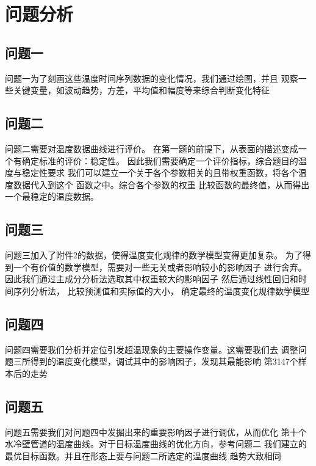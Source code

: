 \section{问题分析}
    \subsection{问题一}
    问题一为了刻画这些温度时间序列数据的变化情况，我们通过绘图，并且
    观察一些关键变量，如波动趋势，方差，平均值和幅度等来综合判断变化特征
    \subsection{问题二}
    问题二需要对温度数据曲线进行评价。
    在第一题的前提下，从表面的描述变成一个有确定标准的评价：稳定性。
    因此我们需要确定一个评价指标，综合题目的温度与稳定性要求
    我们可以建立一个关于各个参数相关的且带权重函数，将各个温度数据代入到这个
    函数之中。综合各个参数的权重
    比较函数的最终值，从而得出一个最稳定的温度数据。
    \subsection{问题三}
    问题三加入了附件2的数据，使得温度变化规律的数学模型变得更加复杂。
    为了得到一个有价值的数学模型，需要对一些无关或者影响较小的影响因子
    进行舍弃。因此我们通过主成分分析法选取其中权重较大的影响因子
    然后通过线性回归和时间序列分析法，
    比较预测值和实际值的大小，
    确定最终的温度变化规律数学模型
    \subsection{问题四}
    问题四需要我们分析并定位引发超温现象的主要操作变量。这需要我们去
    调整问题三所得到的温度变化模型，调试其中的影响因子，发现其最能影响
    第3147个样本后的走势
    \subsection{问题五}
    问题五需要我们对问题四中发掘出来的重要影响因子进行调优，从而优化
    第十个水冷壁管道的温度曲线。对于目标温度曲线的优化方向，参考问题二
    我们建立的最优目标函数。并且在形态上要与问题二所选定的温度曲线
    趋势大致相同


